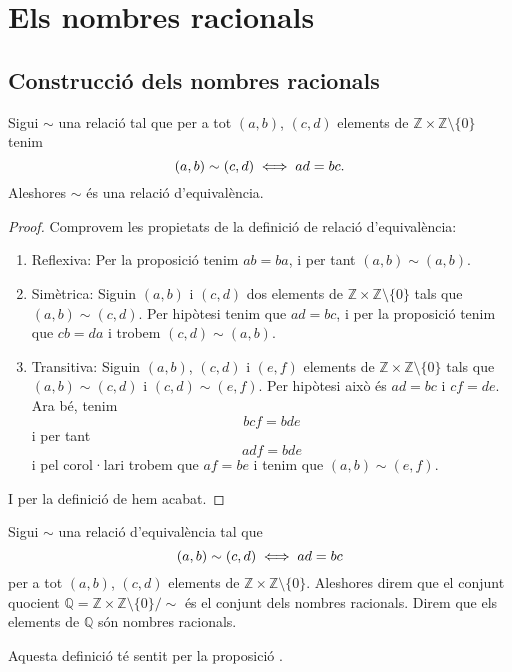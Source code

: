 \documentclass[../../Main.tex]{subfiles}
\begin{document}
\section{Els nombres racionals}
	\subsection{Construcció dels nombres racionals}
	\begin{proposition}
		\label{prop:nombres racionals}
		Sigui \(\sim\) una relació tal que per a tot \((a,b)\), \((c,d)\) elements de \(\mathbb{Z}\times\mathbb{Z}\setminus\{0\}\) tenim
		\[(a,b)\sim(c,d)\iff ad=bc.\]
		Aleshores \(\sim\) és una relació d'equivalència.
		\begin{proof}
			Comprovem les propietats de la definició de relació d'equivalència:
			\begin{enumerate}
				\item Reflexiva: Per la proposició  tenim \(ab=ba\), i per tant \((a,b)\sim(a,b)\).
				\item Simètrica: Siguin \((a,b)\) i \((c,d)\) dos elements de \(\mathbb{Z}\times\mathbb{Z}\setminus\{0\}\) tals que \((a,b)\sim(c,d)\). Per hipòtesi tenim que \(ad=bc\), i per la proposició  tenim que \(cb=da\) i trobem \((c,d)\sim(a,b)\).
				\item Transitiva:  Siguin \((a,b)\), \((c,d)\) i \((e,f)\) elements de \(\mathbb{Z}\times\mathbb{Z}\setminus\{0\}\) tals que \((a,b)\sim(c,d)\) i \((c,d)\sim(e,f)\). Per hipòtesi això és \(ad=bc\) i \(cf=de\). Ara bé, tenim
				\[bcf=bde\]
				i per tant
				\[adf=bde\]
				i pel corol·lari  trobem que \(af=be\) i tenim que \((a,b)\sim(e,f)\).
			\end{enumerate}
			I per la definició de  hem acabat.
		\end{proof}
	\end{proposition}
	\begin{definition}
		\label{def:nombres racionals}
		Sigui \(\sim\) una relació d'equivalència tal que
		\[(a,b)\sim(c,d)\iff ad=bc\]
		per a tot \((a,b)\), \((c,d)\) elements de \(\mathbb{Z}\times\mathbb{Z}\setminus\{0\}\).
		Aleshores direm que el conjunt quocient \(\mathbb{Q}=\mathbb{Z}\times\mathbb{Z}\setminus\{0\}/\sim\) és el conjunt dels nombres racionals. Direm que els elements de \(\mathbb{Q}\) són nombres racionals.
		
		Aquesta definició té sentit per la proposició .
	\end{definition}
\end{document}
